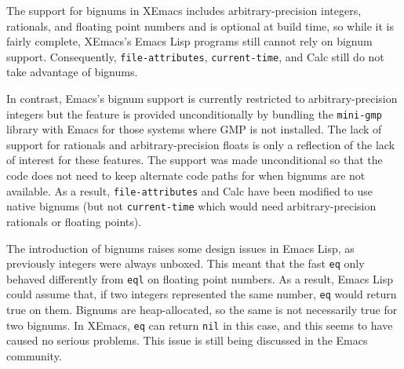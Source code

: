 \documentclass[format=acmsmall, review]{acmart}
\newcommand \Elisp {Emacs Lisp}
\begin{document}
The support for bignums in XEmacs includes arbitrary-precision integers,
rationals, and floating point numbers and is optional at build time, so
while it is fairly complete, XEmacs's \Elisp{} programs still cannot rely on
bignum support.  Consequently, \texttt{file-attributes},
\texttt{current-time}, and Calc still do not take advantage of bignums.

In contrast, Emacs's bignum support is currently restricted to
arbitrary-precision integers but the feature is provided unconditionally by
bundling the \texttt{mini-gmp} library with Emacs for those systems where
GMP is not installed.  The lack of support for rationals and
arbitrary-precision floats is only a reflection of the lack of interest for
these features.  The support was made unconditional so that the code does
not need to keep alternate code paths for when bignums are not available.
As a result, \texttt{file-attributes} and Calc have been modified to use
native bignums (but not \texttt{current-time} which would need
arbitrary-precision rationals or floating points).

The introduction of bignums raises some design issues in \Elisp, as
previously integers were always unboxed.  This meant that the fast
\texttt{eq} only behaved differently from \texttt{eql} on floating point
numbers.  As a result, \Elisp{} could assume that, if two integers
represented the same number, \texttt{eq} would return true on them.
Bignums are heap-allocated, so the same is not necessarily true for two
bignums.  In XEmacs, \texttt{eq} can return \texttt{nil} in this case, and
this seems to have caused no serious problems.
This issue is still being discussed in the Emacs community.






\end{document}
